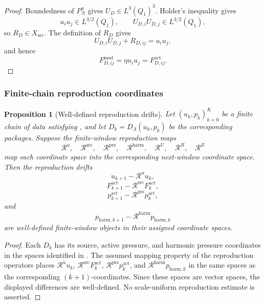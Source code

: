 \documentclass[11pt]{article}
\numberwithin{equation}{section}
\newtheorem{proposition}[proposition]{Proposition}
\theoremstyle{definition}
\theoremstyle{remark}
\newcommand{\src}{\mathrm{src}}
\begin{document}
\begin{proof}
Boundedness of \(P_N^u\) gives \(U_D\in L^3(Q_1)^3\).  Holder's inequality gives
\[
    u_i u_j\in L^{3/2}(Q_1),
    \qquad
    U_{D,i}U_{D,j}\in L^{3/2}(Q_1),
\]
so \(R_D\in X_{\src}\).  The definition of \(R_D\) gives
\[
    U_{D,i}U_{D,j}+R_{D,ij}=u_i u_j,
\]
and hence
\[
    F_{D,ij}^{\mathrm{mod}}
    =
    \eta u_i u_j
    =
    F_{D,ij}^{\mathrm{act}}.
\]
\end{proof}

\subsubsection{Finite-chain reproduction coordinates}

\begin{proposition}[Well-defined reproduction drifts]
\label{prop:reproduction-realizability}
Let \((u_k,p_k)_{k=0}^K\) be a finite chain of data satisfying
, and let \(D_k=D_\Lambda(u_k,p_k)\) be the
corresponding packages.  Suppose the finite-window reproduction maps
\[
    \mathcal R^u,\quad
    \mathcal R^{\src},\quad
    \mathcal R^{\mathrm{prs}},\quad
    \mathcal R^{\mathrm{harm}},\quad
    \mathcal R^U,\quad
    \mathcal R^R,\quad
    \mathcal R^E
\]
map each coordinate space into the corresponding next-window coordinate space.
Then the reproduction drifts
\[
    u_{k+1}-\mathcal R^u u_k,
\]
\[
    F^{\mathrm{act}}_{k+1}
    -
    \mathcal R^{\src}F^{\mathrm{act}}_k,
\]
\[
    p^{\mathrm{act}}_{k+1}
    -
    \mathcal R^{\mathrm{prs}}p^{\mathrm{act}}_k,
\]
and
\[
    p_{\mathrm{harm},k+1}
    -
    \mathcal R^{\mathrm{harm}}p_{\mathrm{harm},k}
\]
are well-defined finite-window objects in their assigned coordinate spaces.
\end{proposition}

\begin{proof}
Each \(D_k\) has its source, active pressure, and harmonic pressure coordinates
in the spaces identified in .  The
assumed mapping property of the reproduction operators places
\(\mathcal R^u u_k\), \(\mathcal R^{\src}F^{\mathrm{act}}_k\),
\(\mathcal R^{\mathrm{prs}}p^{\mathrm{act}}_k\), and
\(\mathcal R^{\mathrm{harm}}p_{\mathrm{harm},k}\) in the same spaces as the
corresponding \((k+1)\)-coordinates.  Since these spaces are vector spaces, the
displayed differences are well-defined.  No scale-uniform reproduction estimate
is asserted.
\end{proof}
\end{document}
